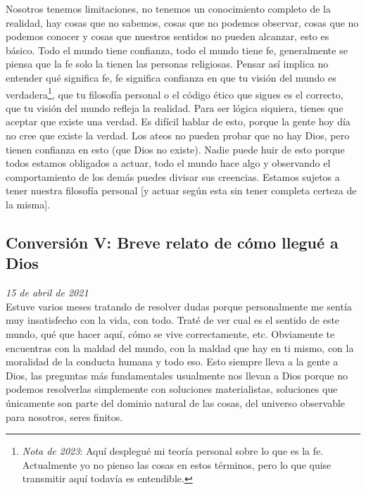 \documentclass[12pt]{article}
\begin{document}
	Nosotros tenemos limitaciones, no tenemos un conocimiento completo de la
	realidad, hay cosas que no sabemos, cosas que no podemos observar,
	cosas que no podemos conocer y cosas que nuestros sentidos no pueden
	alcanzar, esto es básico. Todo el mundo tiene confianza, todo el mundo
	tiene fe, generalmente se piensa que la fe solo la tienen las personas
	religiosas. Pensar así implica no entender qué significa fe, fe
	significa confianza en que tu visión del mundo es
	verdadera\footnote{\textit{Nota de 2023}: Aquí desplegué mi teoría
	personal sobre lo que es la fe. Actualmente yo no pienso las cosas en
	estos términos, pero lo que quise transmitir aquí todavía es
	entendible.},
	que tu
	filosofía personal o el código ético que sigues es el correcto, que tu
	visión del mundo refleja la realidad. Para ser lógica siquiera, tienes
	que aceptar que existe una verdad. Es difícil hablar de esto, porque la
	gente hoy día no cree que existe la verdad. Los ateos no pueden probar
	que no hay Dios, pero tienen confianza en esto (que Dios no existe).
	Nadie puede huir de esto porque todos estamos obligados a actuar, todo
	el mundo hace algo y observando el comportamiento de los demás puedes
	divisar sus creencias. Estamos sujetos a tener nuestra filosofía
	personal [y actuar según esta sin tener completa certeza de la misma].

	\newpage

	\subsection{Conversión V: Breve relato de cómo llegué a Dios}

	\textit{15 de abril de 2021}\\

	Estuve varios meses tratando de resolver dudas porque personalmente me
	sentía muy insatisfecho con la vida, con todo. Traté
	 de ver cual es el sentido de este mundo, qué
	 que hacer aquí, cómo se vive correctamente, etc.
	Obviamente te encuentras con la maldad del mundo, con la maldad que hay
	en ti mismo, con la moralidad de la conducta humana y todo eso. Esto
	siempre lleva a la gente a Dios, las preguntas más fundamentales
	usualmente nos llevan a Dios porque no podemos resolverlas simplemente
	con soluciones materialistas, soluciones que únicamente son parte del
	dominio natural de las cosas, del universo observable para nosotros,
	seres finitos.
\end{document}
